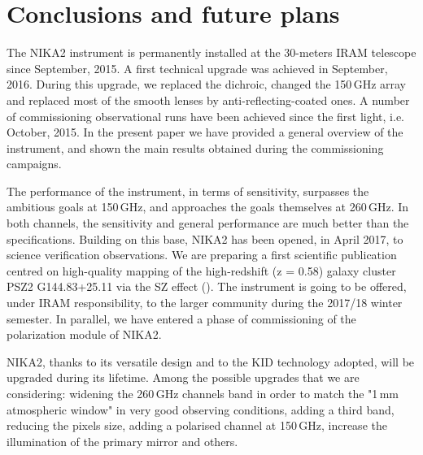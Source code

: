 \documentclass[]{aa} %
\begin{document}
\section{Conclusions and future plans}

The NIKA2 instrument is permanently installed at the 30-meters IRAM telescope since September, 2015. A first technical upgrade was achieved in September, 2016. During this upgrade, we replaced the dichroic, changed the 150\,GHz array and replaced most of the smooth lenses by anti-reflecting-coated ones. A number of commissioning observational runs have been achieved since the first light, i.e. October, 2015. In the present paper we have provided a general overview of the instrument, and shown the main results obtained during the commissioning campaigns. 

The performance of the instrument, in terms of sensitivity, surpasses the ambitious goals at 150\,GHz, and approaches the goals themselves at 260\,GHz. In both channels, the sensitivity and general performance are much better than the specifications. 
Building on this base, NIKA2 has been opened, in April 2017, to science verification observations. We are preparing a first scientific publication centred on high-quality mapping of the high-redshift (z = 0.58) galaxy cluster PSZ2 G144.83+25.11 via the SZ effect (\cite{Ruppin2017}). The instrument is going to be offered, under IRAM responsibility, to the larger community during the 2017/18 winter semester. In parallel, we have entered a phase of commissioning of the polarization module of NIKA2. 

NIKA2, thanks to its versatile design and to the KID technology adopted, will be upgraded during its lifetime. Among the possible upgrades that we are considering: widening the 260\,GHz channels band in order to match the "1\,mm atmospheric window" in very good observing conditions, adding a third band, reducing the pixels size, adding a polarised channel at 150\,GHz, increase the illumination of the primary mirror and others. 

\end{document}

